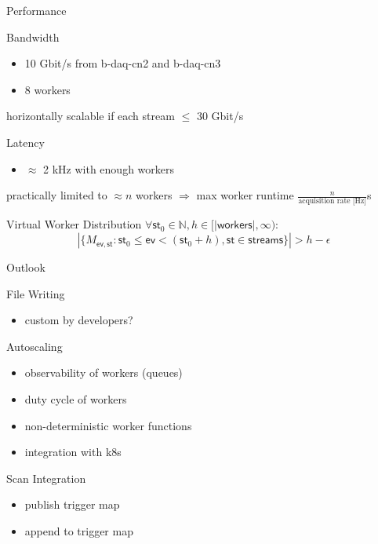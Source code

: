 \documentclass[aspectratio=169]{beamer}
\begin{document}
\begin{frame}{Performance}
 \begin{block}{Bandwidth}
  \begin{itemize}
   \item 10 Gbit/s from b-daq-cn2 and b-daq-cn3
   \item 8 workers
  \end{itemize}
 horizontally scalable if each stream $\leq$ 30 Gbit/s
 \end{block}

 \begin{block}{Latency}
  \begin{itemize}
   \item $\approx$ 2 kHz with enough workers
  \end{itemize}
  practically limited to $\approx n$  workers $\Rightarrow$ max worker runtime $\frac{n}{\text{acquisition rate [Hz]}}$s
 \end{block}
    \newcommand{\ev}{\mathsf{ev}}
    \newcommand{\st}{\mathsf{st}}
  \begin{block}{Virtual Worker Distribution}
  $\forall \st_0\in\mathbb{N}, h\in[|\mathsf{workers}|,\infty):$
   \[|\{M_{\ev,\st} : \st_0\leq\ev<(\st_0+h), \st\in\mathsf{streams}\}| > h-\epsilon \]
  \end{block}


\end{frame}




\begin{frame}{Outlook}
 \begin{block}{File Writing}
  \begin{itemize}
   \item custom by developers?
  \end{itemize}

 \end{block}

 \begin{block}{Autoscaling}
  \begin{itemize}
   \item observability of workers (queues)
   \item duty cycle of workers
   \item non-deterministic worker functions
   \item integration with k8s
  \end{itemize}

 \end{block}


 \begin{block}{Scan Integration}
  \begin{itemize}
   \item publish trigger map
   \item append to trigger map
  \end{itemize}

 \end{block}

\end{frame}
\end{document}

